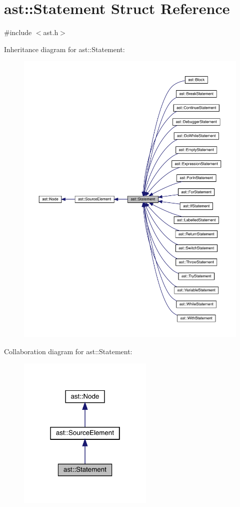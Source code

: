 \hypertarget{structast_1_1_statement}{}\section{ast\+:\+:Statement Struct Reference}
\label{structast_1_1_statement}


{\ttfamily \#include $<$ast.\+h$>$}



Inheritance diagram for ast\+:\+:Statement\+:
\nopagebreak
\begin{figure}[H]
\begin{center}
\leavevmode
\includegraphics[width=350pt]{structast_1_1_statement__inherit__graph}
\end{center}
\end{figure}


Collaboration diagram for ast\+:\+:Statement\+:
\nopagebreak
\begin{figure}[H]
\begin{center}
\leavevmode
\includegraphics[width=183pt]{structast_1_1_statement__coll__graph}
\end{center}
\end{figure}
